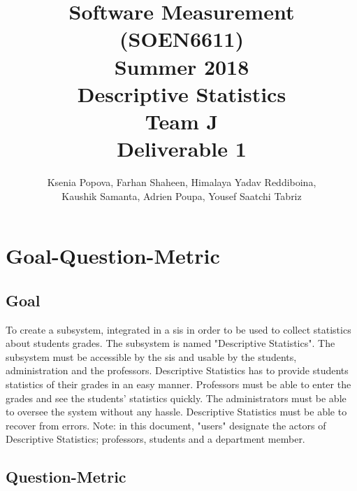 \documentclass[11pt]{article}
\begin{document}
\title{Software Measurement (SOEN6611)\\Summer 2018\\Descriptive Statistics\\Team J\\Deliverable 1}
\author{Ksenia Popova, Farhan Shaheen, Himalaya Yadav Reddiboina,\\Kaushik Samanta, Adrien Poupa, Yousef Saatchi Tabriz}
\date{}
\maketitle

\newpage

\tableofcontents

\newpage
\section{Goal-Question-Metric}

\subsection{Goal}

To create a subsystem, integrated in a \gls{sis} in order to be used to collect statistics about students grades. The subsystem is named "Descriptive Statistics". The subsystem must be accessible by the \gls{sis} and usable by the students, administration and the professors. Descriptive Statistics has to provide students statistics of their grades in an easy manner. Professors must be able to enter the grades and see the students' statistics quickly. The administrators must be able to oversee the system without any hassle. Descriptive Statistics must be able to recover from errors.
\newline
\newline
Note: in this document, "users" designate the actors of Descriptive Statistics; professors, students and a department member.

\subsection{Question-Metric}
\end{document}
